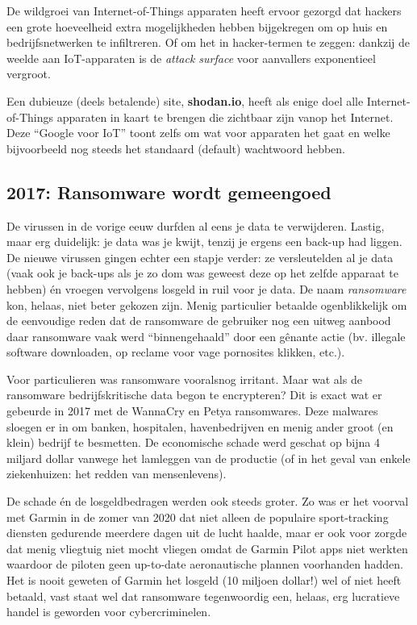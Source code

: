 \documentclass[
  10pt,
  dutch,
  paper=a4,
  ,captions=tableheading
]{scrbook}
\begin{document}
\begin{tipblock}
De wildgroei van Internet-of-Things apparaten heeft ervoor gezorgd dat
hackers een grote hoeveelheid extra mogelijkheden hebben bijgekregen om
op huis en bedrijfsnetwerken te infiltreren. Of om het in hacker-termen
te zeggen: dankzij de weelde aan IoT-apparaten is de \emph{attack
surface} voor aanvallers exponentieel vergroot.
\end{tipblock}

\begin{warningblock}
Een dubieuze (deels betalende) site, \textbf{shodan.io}, heeft als enige
doel alle Internet-of-Things apparaten in kaart te brengen die zichtbaar
zijn vanop het Internet. Deze ``Google voor IoT'' toont zelfs om wat
voor apparaten het gaat en welke bijvoorbeeld nog steeds het standaard
(default) wachtwoord hebben.
\end{warningblock}

\subsection{2017: Ransomware wordt
gemeengoed}\label{ransomware-wordt-gemeengoed}

De virussen in de vorige eeuw durfden al eens je data te verwijderen.
Lastig, maar erg duidelijk: je data was je kwijt, tenzij je ergens een
back-up had liggen. De nieuwe virussen gingen echter een stapje verder:
ze versleutelden al je data (vaak ook je back-ups als je zo dom was
geweest deze op het zelfde apparaat te hebben) én vroegen vervolgens
losgeld in ruil voor je data. De naam \emph{ransomware} kon, helaas,
niet beter gekozen zijn. Menig particulier betaalde ogenblikkelijk om de
eenvoudige reden dat de ransomware de gebruiker nog een uitweg aanbood
daar ransomware vaak werd ``binnengehaald'' door een gênante actie (bv.
illegale software downloaden, op reclame voor vage pornosites klikken,
etc.).

Voor particulieren was ransomware vooralsnog irritant. Maar wat als de
ransomware bedrijfskritische data begon te encrypteren? Dit is exact wat
er gebeurde in 2017 met de WannaCry en Petya ransomwares. Deze malwares
sloegen er in om banken, hospitalen, havenbedrijven en menig ander groot
(en klein) bedrijf te besmetten. De economische schade werd geschat op
bijna 4 miljard dollar vanwege het lamleggen van de productie (of in het
geval van enkele ziekenhuizen: het redden van mensenlevens).

De schade én de losgeldbedragen werden ook steeds groter. Zo was er het
voorval met Garmin in de zomer van 2020 dat niet alleen de populaire
sport-tracking diensten gedurende meerdere dagen uit de lucht haalde,
maar er ook voor zorgde dat menig vliegtuig niet mocht vliegen omdat de
Garmin Pilot apps niet werkten waardoor de piloten geen up-to-date
aeronautische plannen voorhanden hadden. Het is nooit geweten of Garmin
het losgeld (10 miljoen dollar!) wel of niet heeft betaald, vast staat
wel dat ransomware tegenwoordig een, helaas, erg lucratieve handel is
geworden voor cybercriminelen.
\end{document}
